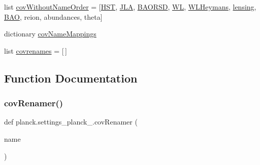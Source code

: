 \begin{DoxyCompactItemize}
list \mbox{\hyperlink{namespaceplanck_1_1settings__planck__2015_a9349449a25760a5f21bf839a04049b7f}{cov\+Without\+Name\+Order}} = \mbox{[}\mbox{\hyperlink{namespaceplanck_1_1settings__planck__2015_a07bbdc37cac88460480c8e0389b1c0a2}{H\+ST}}, \textquotesingle{}\mbox{\hyperlink{namespaceplanck_1_1settings__planck__2015_a228e145e679385378b71ad2948b85ba1}{J\+LA}}\textquotesingle{}, \mbox{\hyperlink{namespaceplanck_1_1settings__planck__2015_aa1979503708bc66f1a5ca6c26181194a}{B\+A\+O\+R\+SD}}, \textquotesingle{}\mbox{\hyperlink{namespaceplanck_1_1settings__planck__2015_aa1d1a83b8a1a78949591d158a6ed5188}{WL}}\textquotesingle{}, \textquotesingle{}\mbox{\hyperlink{namespaceplanck_1_1settings__planck__2015_a3c67b8a390704c0dd6d3ee12ba851a4b}{W\+L\+Heymans}}\textquotesingle{}, \textquotesingle{}\mbox{\hyperlink{namespaceplanck_1_1settings__planck__2015_ad92b077f23ecca52bf992daa771c2686}{lensing}}\textquotesingle{}, \textquotesingle{}\mbox{\hyperlink{namespaceplanck_1_1settings__planck__2015_a13c1148a7d97e3efecfd5232156a362b}{B\+AO}}\textquotesingle{}, \textquotesingle{}reion\textquotesingle{}, \textquotesingle{}abundances\textquotesingle{}, \textquotesingle{}theta\textquotesingle{}\mbox{]}
\item 
dictionary \mbox{\hyperlink{namespaceplanck_1_1settings__planck__2015_a912ce0d93b4a9bc676f10287169a3e47}{cov\+Name\+Mappings}}
\item 
list \mbox{\hyperlink{namespaceplanck_1_1settings__planck__2015_af879ef56dbb22b01d72c8ebdc65d4d0b}{covrenames}} = \mbox{[}$\,$\mbox{]}
\end{DoxyCompactItemize}


\subsection{Function Documentation}
\mbox{\label{namespaceplanck_1_1settings__planck__2015_ad5a9e9753f087ecf6ea778f9bb1bbd2b}} 
\subsubsection{\texorpdfstring{cov\+Renamer()}{covRenamer()}}
{\footnotesize\ttfamily def planck.\+settings\+\_\+planck\+\_.\+cov\+Renamer (\begin{DoxyParamCaption}\item[{}]{name }\end{DoxyParamCaption})}



